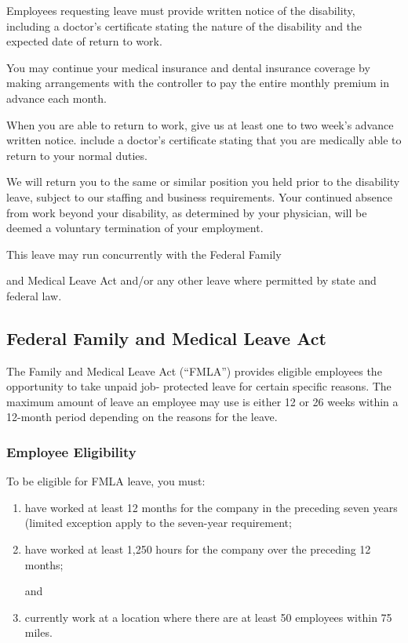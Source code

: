 Employees requesting leave must provide written notice of the disability, including a doctor's certificate stating the nature of the disability and the expected date of return to work.

You may continue your medical insurance and dental insurance coverage by making arrangements with the controller to pay the entire monthly premium in advance each month.

When you are able to return to work, give us at least one to two week's advance written notice. include a doctor's certificate stating that you are medically able to return to your normal duties.

We will return you to the same or similar position you held prior to the disability leave, subject to our staffing and business requirements. Your continued absence from work beyond your disability, as determined by your physician, will be deemed a voluntary termination of your employment.

This leave may run concurrently with the Federal Family

and Medical Leave Act and/or any other leave where permitted by state and federal law.

\subsection{Federal Family and Medical Leave Act}

The Family and Medical Leave Act (“FMLA”) provides eligible employees the opportunity to take unpaid job- protected leave for certain specific reasons. The maximum amount of leave an employee may use is either 12 or 26 weeks within a 12-month period depending on the reasons for the leave.

\subsubsection{Employee Eligibility}

To be eligible for FMLA leave, you must:

\begin{enumerate} 	\item have worked at least 12 months for the company 	in the preceding seven years (limited exception 	apply to the seven-year requirement;
	
	\item have worked at least 1,250 hours for the 	company over the preceding 12 months;
	
	and
	
	\item currently work at a location where there are at 	least 50 employees within 75 miles. \end{enumerate}

